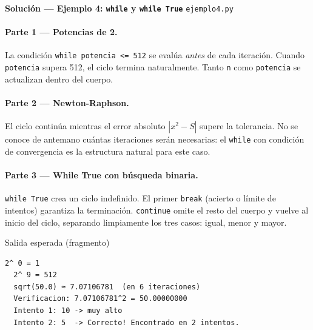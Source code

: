 \documentclass[12pt,a4paper]{article}
\begin{document}
\newpage
\begin{solucionbanner}
  {\large\bfseries\color{solColor} Solución — Ejemplo 4: \texttt{while} y \texttt{while True}}
  \hfill \texttt{ejemplo4.py}
\end{solucionbanner}

\vspace{0.8em}


\vspace{0.8em}
\paragraph{Parte 1 — Potencias de 2.}
La condición \texttt{while potencia <= 512} se evalúa \emph{antes} de cada
iteración.  Cuando \texttt{potencia} supera 512, el ciclo termina naturalmente.
Tanto \texttt{n} como \texttt{potencia} se actualizan dentro del cuerpo.

\paragraph{Parte 2 — Newton-Raphson.}
El ciclo continúa mientras el error absoluto $|x^2 - S|$ supere la tolerancia.
No se conoce de antemano cuántas iteraciones serán necesarias: el \texttt{while}
con condición de convergencia es la estructura natural para este caso.

\paragraph{Parte 3 — While True con búsqueda binaria.}
\texttt{while True} crea un ciclo indefinido.  El primer \texttt{break}
(acierto o límite de intentos) garantiza la terminación.
\texttt{continue} omite el resto del cuerpo y vuelve al inicio del ciclo,
separando limpiamente los tres casos: igual, menor y mayor.

\vspace{0.6em}
\begin{salidabox}{Salida esperada (fragmento)}
\begin{lstlisting}[style=OutputStyle]
  2^ 0 = 1
  2^ 9 = 512
  sqrt(50.0) ≈ 7.07106781  (en 6 iteraciones)
  Verificacion: 7.07106781^2 = 50.00000000
  Intento 1: 10 -> muy alto
  Intento 2: 5  -> Correcto! Encontrado en 2 intentos.
\end{lstlisting}
\end{salidabox}
\end{document}

